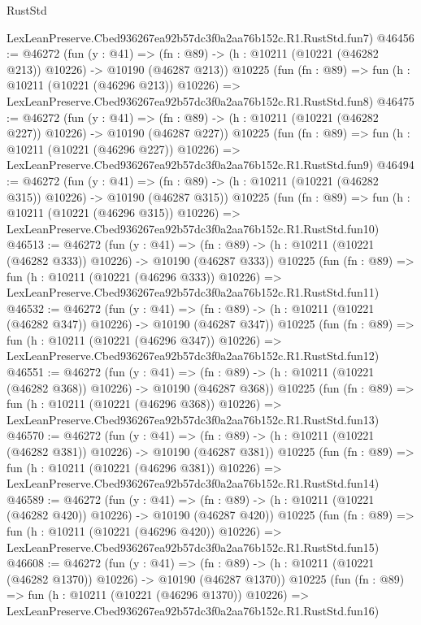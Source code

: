 \begin{lexlean}{RustStd}
\begin{coremodule}
    LexLeanPreserve.Cbed936267ea92b57dc3f0a2aa76b152c.R1.RustStd.fun7)
@46456 := @46272
    (fun (y : @41) =>
    (fn : @89) -> (h : @10211 (@10221 (@46282 @213)) @10226) -> @10190 (@46287 @213))
    @10225
    (fun (fn : @89) =>
    fun (h : @10211 (@10221 (@46296 @213)) @10226) =>
    LexLeanPreserve.Cbed936267ea92b57dc3f0a2aa76b152c.R1.RustStd.fun8)
@46475 := @46272
    (fun (y : @41) =>
    (fn : @89) -> (h : @10211 (@10221 (@46282 @227)) @10226) -> @10190 (@46287 @227))
    @10225
    (fun (fn : @89) =>
    fun (h : @10211 (@10221 (@46296 @227)) @10226) =>
    LexLeanPreserve.Cbed936267ea92b57dc3f0a2aa76b152c.R1.RustStd.fun9)
@46494 := @46272
    (fun (y : @41) =>
    (fn : @89) -> (h : @10211 (@10221 (@46282 @315)) @10226) -> @10190 (@46287 @315))
    @10225
    (fun (fn : @89) =>
    fun (h : @10211 (@10221 (@46296 @315)) @10226) =>
    LexLeanPreserve.Cbed936267ea92b57dc3f0a2aa76b152c.R1.RustStd.fun10)
@46513 := @46272
    (fun (y : @41) =>
    (fn : @89) -> (h : @10211 (@10221 (@46282 @333)) @10226) -> @10190 (@46287 @333))
    @10225
    (fun (fn : @89) =>
    fun (h : @10211 (@10221 (@46296 @333)) @10226) =>
    LexLeanPreserve.Cbed936267ea92b57dc3f0a2aa76b152c.R1.RustStd.fun11)
@46532 := @46272
    (fun (y : @41) =>
    (fn : @89) -> (h : @10211 (@10221 (@46282 @347)) @10226) -> @10190 (@46287 @347))
    @10225
    (fun (fn : @89) =>
    fun (h : @10211 (@10221 (@46296 @347)) @10226) =>
    LexLeanPreserve.Cbed936267ea92b57dc3f0a2aa76b152c.R1.RustStd.fun12)
@46551 := @46272
    (fun (y : @41) =>
    (fn : @89) -> (h : @10211 (@10221 (@46282 @368)) @10226) -> @10190 (@46287 @368))
    @10225
    (fun (fn : @89) =>
    fun (h : @10211 (@10221 (@46296 @368)) @10226) =>
    LexLeanPreserve.Cbed936267ea92b57dc3f0a2aa76b152c.R1.RustStd.fun13)
@46570 := @46272
    (fun (y : @41) =>
    (fn : @89) -> (h : @10211 (@10221 (@46282 @381)) @10226) -> @10190 (@46287 @381))
    @10225
    (fun (fn : @89) =>
    fun (h : @10211 (@10221 (@46296 @381)) @10226) =>
    LexLeanPreserve.Cbed936267ea92b57dc3f0a2aa76b152c.R1.RustStd.fun14)
@46589 := @46272
    (fun (y : @41) =>
    (fn : @89) -> (h : @10211 (@10221 (@46282 @420)) @10226) -> @10190 (@46287 @420))
    @10225
    (fun (fn : @89) =>
    fun (h : @10211 (@10221 (@46296 @420)) @10226) =>
    LexLeanPreserve.Cbed936267ea92b57dc3f0a2aa76b152c.R1.RustStd.fun15)
@46608 := @46272
    (fun (y : @41) =>
    (fn : @89) -> (h : @10211 (@10221 (@46282 @1370)) @10226) -> @10190 (@46287 @1370))
    @10225
    (fun (fn : @89) =>
    fun (h : @10211 (@10221 (@46296 @1370)) @10226) =>
    LexLeanPreserve.Cbed936267ea92b57dc3f0a2aa76b152c.R1.RustStd.fun16)

\end{coremodule}
\end{lexlean}
